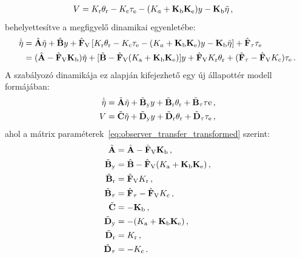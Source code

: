 \begin{equation}
    \begin{split}
        V &= K_{\mathrm{r}} \theta_{\mathrm{r}} - K_{\mathrm{c}} \tau_{\mathrm{e}} - (K_a + \mathbf{K}_{\mathrm{b}} \mathbf{K}_{\mathrm{e}}) y - \mathbf{K}_{\mathrm{b}} \tilde{\mathbf{\eta}}\,,
    \end{split}
\end{equation}
behelyettesítve a megfigyelő dinamikai egyenletébe:
\begin{align}\label{eq:observer_transfer_transformed}
    \begin{split}
        \dot{\tilde{\mathbf{\eta}}} &= \hat{\mathbf{A}} \tilde{\mathbf{\eta}} + 
        \hat{\mathbf{B}} y + 
        \hat{\mathbf{F}}_{\mathrm{V}}\left[K_{\mathrm{r}} \theta_{\mathrm{r}} - K_{\mathrm{c}} \tau_{\mathrm{e}} - (K_a + \mathbf{K}_{\mathrm{b}} \mathbf{K}_{\mathrm{e}}) y - \mathbf{K}_{\mathrm{b}} \tilde{\mathbf{\eta}}\right] + 
        \hat{\mathbf{F}}_{\mathrm{\tau}} \tau_{\mathrm{e}} \\
        &= (\hat{\mathbf{A}} - \hat{\mathbf{F}}_{\mathrm{V}} \mathbf{K}_{\mathrm{b}})\tilde{\mathbf{\eta}} + 
        [\hat{\mathbf{B}} - \hat{\mathbf{F}}_{\mathrm{V}} (K_{\mathrm{a}} + \mathbf{K}_{\mathrm{b}} \mathbf{K}_{\mathrm{e}})]y + 
        \hat{\mathbf{F}}_{\mathrm{V}} K_{\mathrm{r}} \theta_{\mathrm{r}} + 
        (\hat{\mathbf{F}}_{\mathrm{\tau}} - \hat{\mathbf{F}}_{\mathrm{V}} K_{\mathrm{c}}) \tau_{\mathrm{e}}\,.
    \end{split}
\end{align}
A szabályozó dinamikája ez alapján kifejezhető egy új állapottér modell formájában:
\begin{align}\label{eq:controller_state_space}
    \begin{split}
        \dot{\tilde{\mathbf{\eta}}} &= \tilde{\mathbf{A}}\tilde{\mathbf{\eta}} + 
        \tilde{\mathbf{B}}_{\mathrm{y}} y + 
        \tilde{\mathbf{B}}_{\mathrm{r}} \theta_{\mathrm{r}} +
        \tilde{\mathbf{B}}_{\mathrm{\tau}} \tau\mathrm{e}\,, \\
        V &= \tilde{\mathbf{C}}\tilde{\mathbf{\eta}} + 
        \tilde{\mathbf{D}}_{\mathrm{y}} y + 
        \tilde{\mathbf{D}}_{\mathrm{r}} \theta_{\mathrm{r}} + 
        \tilde{\mathbf{D}}_{\mathrm{\tau}} \tau_{\mathrm{e}}\,,
    \end{split}
\end{align}
ahol a mátrix paraméterek~\eqref{eq:observer_transfer_transformed} szerint:
\begin{align}
    \begin{split}
        \tilde{\mathbf{A}} &= \hat{\mathbf{A}} - \hat{\mathbf{F}}_{\mathrm{V}} \mathbf{K}_{\mathrm{b}}\,,\\
        \tilde{\mathbf{B}}_{\mathrm{y}} &= \hat{\mathbf{B}} - \hat{\mathbf{F}}_{\mathrm{V}} (K_{\mathrm{a}} + \mathbf{K}_{\mathrm{b}} \mathbf{K}_{\mathrm{e}})\,,\\
        \tilde{\mathbf{B}}_{\mathrm{r}} &= \hat{\mathbf{F}}_{\mathrm{V}} K_{\mathrm{r}}\,, \\
        \tilde{\mathbf{B}}_{\mathrm{\tau}} &= \hat{\mathbf{F}}_{\mathrm{\tau}} - \hat{\mathbf{F}}_{\mathrm{V}} K_{\mathrm{c}}\,, \\
        \tilde{\mathbf{C}} &= -\mathbf{K}_{\mathrm{b}}\,, \\
        \tilde{\mathbf{D}}_{\mathrm{y}} &= -(K_{\mathrm{a}} + \mathbf{K}_{\mathrm{b}} \mathbf{K}_{\mathrm{e}})\,, \\
        \tilde{\mathbf{D}}_{\mathrm{r}} &= K_{\mathrm{r}}\,, \\
        \tilde{\mathbf{D}}_{\mathrm{\tau}} &= -K_{\mathrm{c}}\,.
    \end{split}
\end{align}
